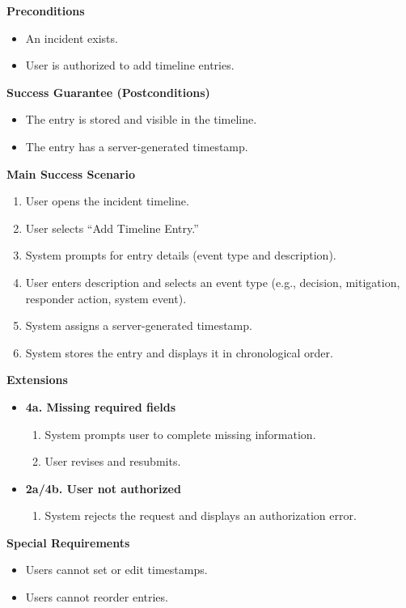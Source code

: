 \documentclass[11pt]{article}
\begin{document}
\textbf{Preconditions}
\begin{itemize}[nosep]
  \item An incident exists.
  \item User is authorized to add timeline entries.
\end{itemize}

\textbf{Success Guarantee (Postconditions)}
\begin{itemize}[nosep]
  \item The entry is stored and visible in the timeline.
  \item The entry has a server-generated timestamp.
\end{itemize}

\textbf{Main Success Scenario}
\begin{enumerate}[nosep]
  \item User opens the incident timeline.
  \item User selects ``Add Timeline Entry.''
  \item System prompts for entry details (event type and description).
  \item User enters description and selects an event type (e.g., decision, mitigation, responder action, system event).
  \item System assigns a server-generated timestamp.
  \item System stores the entry and displays it in chronological order.
\end{enumerate}

\textbf{Extensions}
\begin{itemize}[nosep]
  \item \textbf{4a. Missing required fields}
    \begin{enumerate}[nosep]
      \item System prompts user to complete missing information.
      \item User revises and resubmits.
    \end{enumerate}

  \item \textbf{2a/4b. User not authorized}
    \begin{enumerate}[nosep]
      \item System rejects the request and displays an authorization error.
    \end{enumerate}
\end{itemize}

\textbf{Special Requirements}
\begin{itemize}[nosep]
  \item Users cannot set or edit timestamps.
  \item Users cannot reorder entries.
\end{itemize}
\end{document}

